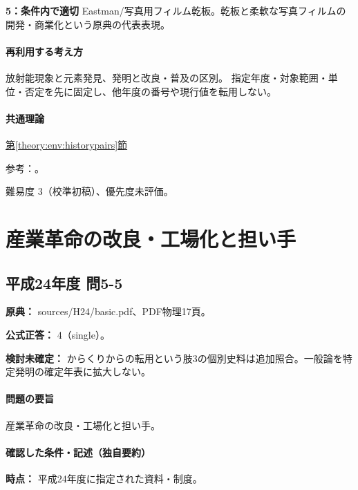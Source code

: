 \noindent\textbf{5：条件内で適切} Eastman/写真用フィルム乾板。乾板と柔軟な写真フィルムの開発・商業化という原典の代表表現。\par

\paragraph{再利用する考え方} 放射能現象と元素発見、発明と改良・普及の区別。 指定年度・対象範囲・単位・否定を先に固定し、他年度の番号や現行値を転用しない。

\paragraph{共通理論} \hyperref[theory:env:historypairs]{第\ref*{theory:env:historypairs}節}

\par 参考：\cite{env58_curie}。

\par 難易度 3（校準初稿）、優先度未評価。

\section{産業革命の改良・工場化と担い手}

\subsection{平成24年度 問5-5}
\label{q:h24-reg-basic-5-5}

\noindent\textbf{原典：} sources/H24/basic.pdf、PDF物理17頁。

\textbf{公式正答：} 4（single）。

\par\textbf{検討未確定：} からくりからの転用という肢3の個別史料は追加照合。一般論を特定発明の確定年表に拡大しない。

\paragraph{問題の要旨} 産業革命の改良・工場化と担い手。

\paragraph{確認した条件・記述（独自要約）}\mbox{}\par

\noindent\textbf{時点：} 平成24年度に指定された資料・制度。\par

